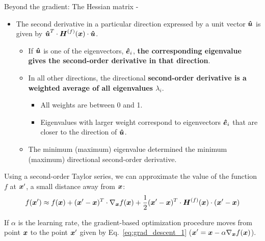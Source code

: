 \begin{frame}[t,allowframebreaks]{
    Beyond the gradient: The Hessian matrix -}
    \begin{itemize}
        \item 
        The second derivative in a particular direction
        expressed by a unit vector $\boldsymbol{\hat{u}}$ is given by
        $\displaystyle \boldsymbol{\hat{u}}^T \cdot \boldsymbol{H}^{(f)}(\boldsymbol{x}) \cdot \boldsymbol{\hat{u}}$.
        \begin{itemize}
            \item If $\boldsymbol{\hat{u}}$ is one of the 
            \glspl{eigenvector}, $\boldsymbol{\hat{e}}_i$,
            {\bf the corresponding 
            \gls{eigenvalue} gives the second-order 
            derivative in that direction}.
            \item In all other directions, the directional 
            {\bf second-order derivative is 
            a weighted average of all \glspl{eigenvalue} $\lambda_{i}$}.
            \begin{itemize}
                \item All weights are between 0 and 1.
                \item Eigenvalues with larger weight correspond to \glspl{eigenvector}
                $\boldsymbol{\hat{e}}_i$ that are closer to the direction of $\boldsymbol{\hat{u}}$.
            \end{itemize}
            \item The minimum (maximum) \gls{eigenvalue} determined the minimum (maximum)
            directional second-order derivative.
        \end{itemize}
    
    \end{itemize}

    \framebreak


    Using a second-order \gls{Taylor series}, we can approximate 
    the value of the function $f$ at $\boldsymbol{x}^\prime$, 
    a small distance away from $\boldsymbol{x}$:
    \vspace{-0.1cm}
    \begin{equation}
        f(\boldsymbol{x}^\prime) \approx 
          f(\boldsymbol{x}) + 
          (\boldsymbol{x}^\prime - \boldsymbol{x})^T \cdot \nabla_{\boldsymbol{x}}f(\boldsymbol{x}) +
          \frac{1}{2} (\boldsymbol{x}^\prime - \boldsymbol{x})^T \cdot 
            \boldsymbol{H}^{(f)}(\boldsymbol{x}) \cdot (\boldsymbol{x}^\prime - \boldsymbol{x})
        \label{eq:hessian_taylor_1}
    \end{equation}

    If $\alpha$ is the \gls{learning rate}, 
    the gradient-based optimization procedure moves from point $\boldsymbol{x}$ 
    to the point $\boldsymbol{x}^\prime$ given by Eq.~\ref{eq:grad_descent_1}
    ($\displaystyle \boldsymbol{x}^\prime = \boldsymbol{x} - \alpha \nabla_{\boldsymbol{x}}f(\boldsymbol{x})$).\\
    \vspace{0.2cm}


\end{frame}
